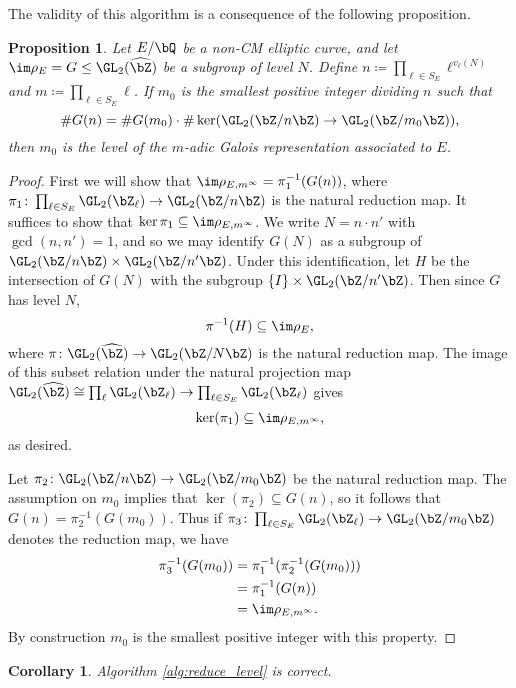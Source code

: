 \documentclass[11pt,reqno]{amsart}
\theoremstyle{plain}
\newtheorem{proposition}[theorem]{Proposition}
\newtheorem{corollary}[theorem]{Corollary}
\theoremstyle{definition}
\newcommand{\Q}{\bQ}
\newcommand{\Z}{\bZ}
\begin{document}
The validity of this algorithm is a consequence of the following proposition.
  \begin{proposition}\label{Prop:Level}
  Let $E/\Q$ be a non-CM elliptic curve, and let $\im \rho_E=G \leq \GL_2(\widehat{\Z})$ be a subgroup of level $N$. Define $n \coloneqq \prod_{\ell \in S_E} \ell^{v_{\ell}(N)}$ and $m\coloneqq \prod_{\ell \in S_E} \ell$. If $m_0$ is the smallest positive integer dividing $n$ such that \[\#G(n)=\#G(m_0) \cdot \#\ker(\GL_2(\Z/n\Z) \rightarrow \GL_2(\Z/m_0\Z)),\] then $m_0$ is the level of the $m$-adic Galois representation associated to $E$.
  \end{proposition}
  \begin{proof}
  First we will show that $\im \rho_{E,m^{\infty}}=\pi_1^{-1}(G(n))$, where $\pi_1\colon \prod_{\ell \in S_E} \GL_2(\Z_{\ell}) \rightarrow \GL_2(\Z/n\Z)$ is the natural reduction map. It suffices to show that $\ker \pi_1 \subseteq \im \rho_{E,m^{\infty}}$. We write $N=n\cdot n'$ with $\gcd(n,n')=1$, and so we may identify $G(N)$ as a subgroup of $\GL_2(\Z/n\Z) \times \GL_2(\Z/n'\Z)$. Under this identification, let $H$  be the intersection of $G(N)$ with the subgroup $\{I\} \times \GL_2(\Z/n'\Z)$. Then since $G$ has level $N$,
  \[
  \pi^{-1}(H) \subseteq \im \rho_E,
  \]
  where $\pi\colon \GL_2(\widehat{\Z}) \rightarrow \GL_2(\Z/N\Z)$ is the natural reduction map. The image of this subset relation under the natural projection map  $\GL_2(\widehat{\Z}) \cong \prod_{\ell} \GL_2(\Z_{\ell}) \rightarrow  \prod_{\ell \in S_E} \GL_2(\Z_{\ell}) $ gives
  \[
  \ker(\pi_1) \subseteq \im \rho_{E,m^{\infty}},
  \]
  as desired.

Let $\pi_2\colon \GL_2(\Z/n\Z) \rightarrow \GL_2(\Z/m_0\Z)$ be the natural reduction map. The assumption on $m_0$ implies that $\ker(\pi_2) \subseteq G(n)$, so it follows that $G(n) = \pi_2^{-1}(G(m_0))$. Thus if $\pi_3\colon \prod_{\ell \in S_E} \GL_2(\Z_{\ell}) \rightarrow \GL_2(\Z/m_0\Z)$ denotes the reduction map, we have
  \begin{align*}
  \pi_3^{-1}(G(m_0))&=\pi_1^{-1}(\pi_2^{-1}(G(m_0)))\\
  &=\pi_1^{-1}(G(n))\\
  &=\im \rho_{E,m^{\infty}}.
  \end{align*}
By construction $m_0$ is the smallest positive integer with this property.
  \end{proof}

\begin{corollary}
  Algorithm \ref{alg:reduce_level} is correct.
\end{corollary}
\end{document}
